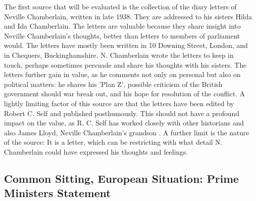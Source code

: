 \documentclass[10pt, a4papert, hidelinks]{article}
\begin{document}

The first source that will be evaluated is the collection of the diary letters of Neville Chamberlain, written in late 1938. They are addressed to his sisters Hilda and Ida Chamberlain. The letters are valuable because they share insight into Neville Chamberlain's thoughts, better than letters to members of parliament would. The letters have mostly been written in 10 Downing Street, London, and in Chequers, Buckinghamshire. N. Chamberlain wrote the letters to keep in touch, perhaps sometimes persuade and share his thoughts with his sisters. The letters further gain in value, as he comments not only on personal but also on political matters: he shares his 'Plan Z', possible criticism of the British government should war break out, and his hope for resolution of the conflict. A lightly limiting factor of this source are that the letters have been edited by Robert C. Self and published posthumously. This should not have a profound impact on the value, as R. C. Self has worked closely with other historians and also James Lloyd, Neville Chamberlain's grandson \cite{chamberlain_neville_2000}. A further limit is the nature of the source: It is a letter, which can be restricting with what detail N. Chamberlain could have expressed his thoughts and feelings.

\subsection{Common Sitting, European Situation: Prime Ministers Statement} %

\end{document}
